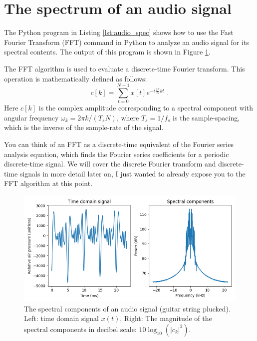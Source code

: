 \section{The spectrum of an audio signal}

The Python program in Listing \ref{lst:audio_spec} shows how to use the Fast Fourier Transform (FFT) command in Python to analyze an audio signal for its spectral contents. The output of this program is shown in Figure \ref{fig:audio_spec}.

The FFT algorithm is used to evaluate a discrete-time Fourier transform. This operation is mathematically defined as follows:
\begin{equation}
c[k] = \sum_{t=0}^{N-1} x[t] e^{-i\frac{2\pi}{N}kt} \,\,.
\end{equation}
Here $c[k]$ is the complex amplitude corresponding to a spectral component with angular frequency $\omega_k = 2\pi k/(T_s N)$, where $T_s=1/f_s$ is the sample-spacing, which is the inverse of the sample-rate of the signal.

You can think of an FFT as a discrete-time equivalent of the Fourier series analysis equation, which finds the Fourier series coefficients for a periodic discrete-time signal. We will cover the discrete Fourier transform and discrete-time signals in more detail later on, I just wanted to already expose you to the FFT algorithm at this point.



\begin{figure}
\begin{center}
\includegraphics[width=\textwidth]{code/013_audio_spec/audio_spec.png}
\end{center}
\caption{The spectral components of an audio signal (guitar string plucked). Left: time domain signal $x(t)$, Right: The magnitude of the spectral components in decibel scale: $10\log_{10}(|c_k|^2)$.}
\label{fig:audio_spec}
\end{figure}
